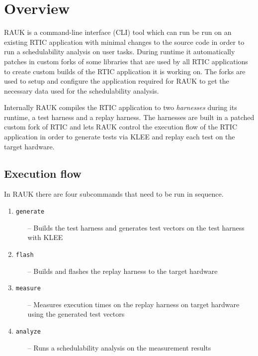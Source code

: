 \section{Overview}
RAUK is a command-line interface (CLI) tool which can run be run on an existing
RTIC application with minimal changes to the source code in order to run a
schedulability analysis on user tasks. During runtime it automatically patches
in custom forks of some libraries that are used by all RTIC applications to
create custom builds of the RTIC application it is working on. The forks are
used to setup and configure the application required for RAUK to get the
necessary data used for the schedulability analysis.

Internally RAUK compiles the RTIC application to two \emph{harnesses} during
its runtime, a test harness and a replay harness. The harnesses are built in a
patched custom fork of RTIC and lets RAUK control the execution flow of the
RTIC application in order to generate tests via KLEE and replay each test on
the target hardware.

\subsection{Execution flow}
In RAUK there are four subcommands that need to be run in sequence.

\begin{enumerate}
    \item \texttt{generate}
    \begin{itemize}
        \item [--] Builds the test harness and generates test vectors on the test
            harness with KLEE
    \end{itemize}
    \item \texttt{flash}
    \begin{itemize}
        \item [--] Builds and flashes the replay harness to the target hardware
    \end{itemize}
    \item \texttt{measure}
    \begin{itemize}
        \item [--] Measures execution times on the replay harness on target
            hardware using the generated test vectors
    \end{itemize}
    \item \texttt{analyze}
    \begin{itemize}
        \item [--] Runs a schedulability analysis on the measurement results
    \end{itemize}
\end{enumerate}


